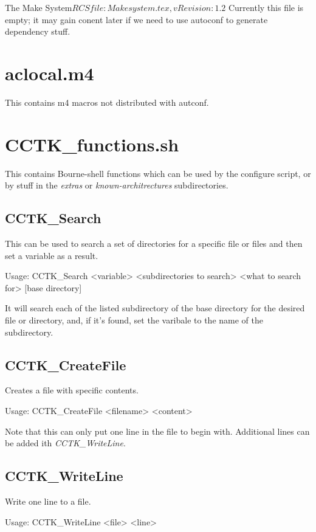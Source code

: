 \begin{cactuspart}{3}{The Make System}{$RCSfile: Makesystem.tex,v $}{$Revision: 1.2 $}
Currently this file is empty;  it may gain conent later if we need to
use autoconf to generate dependency stuff.

\section{aclocal.m4}
\label{sec:autoconf:aclocal}

This contains m4 macros not distributed with autconf.

\section{CCTK\_functions.sh}
\label{sec:autoconf:functions}

This contains Bourne-shell functions which can be used by 
the configure script, or by stuff in the {\em extras} or 
{\em known-architrectures} subdirectories.

\subsection{CCTK\_Search}

This can be used to search a set of directories for a specific file
or files and then set a variable as a result.

Usage: CCTK\_Search <variable> <subdirectories to search> <what to search for> [base directory]

It will search each of the listed subdirectory of the base directory for the desired
file or directory, and, if it's found, set the varibale to the name of the subdirectory.

\subsection{CCTK\_CreateFile}

Creates a file with specific contents.

Usage: CCTK\_CreateFile <filename> <content> 

Note that this can only put one line in the file to begin with.  Additional
lines can be added ith {\em CCTK\_WriteLine}.

\subsection{CCTK\_WriteLine}

Write one line to a file.

Usage: CCTK\_WriteLine <file> <line> 


\end{cactuspart}
